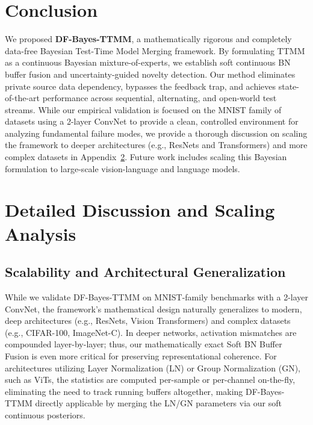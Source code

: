 \documentclass{article}
\theoremstyle{plain}
\theoremstyle{definition}
\theoremstyle{remark}
\begin{document}
\section{Conclusion}\vspace{-0.1in}
\label{sec:conclusion}
We proposed \textbf{DF-Bayes-TTMM}, a mathematically rigorous and completely data-free Bayesian
Test-Time Model Merging framework. By formulating TTMM as a continuous Bayesian mixture-of-experts,
we establish soft continuous BN buffer fusion and uncertainty-guided novelty detection. Our method
eliminates private source data dependency, bypasses the feedback trap, and achieves state-of-the-art
performance across sequential, alternating, and open-world test streams. While our empirical
validation is focused on the MNIST family of datasets using a 2-layer ConvNet to provide a clean,
controlled environment for analyzing fundamental failure modes, we provide a thorough discussion on
scaling the framework to deeper architectures (e.g., ResNets and Transformers) and more complex
datasets in Appendix~\ref{sec:appendix_discussion}. Future work includes scaling this Bayesian
formulation to large-scale vision-language and language models.




\clearpage
\appendix
\onecolumn
\section{Detailed Discussion and Scaling Analysis}
\label{sec:appendix_discussion}

\subsection{Scalability and Architectural Generalization}
While we validate DF-Bayes-TTMM on MNIST-family benchmarks with a 2-layer ConvNet, the framework's
mathematical design naturally generalizes to modern, deep architectures (e.g., ResNets, Vision
Transformers) and complex datasets (e.g., CIFAR-100, ImageNet-C). In deeper networks, activation
mismatches are compounded layer-by-layer; thus, our mathematically exact Soft BN Buffer Fusion is
even more critical for preserving representational coherence. For architectures utilizing Layer
Normalization (LN) or Group Normalization (GN), such as ViTs, the statistics are computed per-sample
or per-channel on-the-fly, eliminating the need to track running buffers altogether, making
DF-Bayes-TTMM directly applicable by merging the LN/GN parameters via our soft continuous
posteriors.
\end{document}
